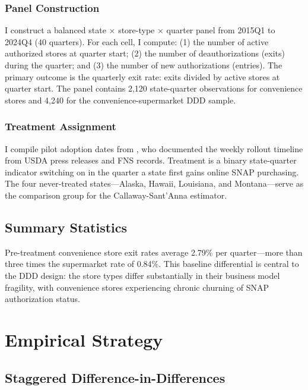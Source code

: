 \documentclass[12pt]{article}
\begin{document}
\subsubsection*{Panel Construction} I construct a balanced state $\times$ store-type $\times$ quarter panel from 2015Q1 to 2024Q4 (40 quarters). For each cell, I compute: (1) the number of active authorized stores at quarter start; (2) the number of deauthorizations (exits) during the quarter; and (3) the number of new authorizations (entries). The primary outcome is the quarterly exit rate: exits divided by active stores at quarter start. The panel contains 2,120 state-quarter observations for convenience stores and 4,240 for the convenience-supermarket DDD sample.

\subsubsection*{Treatment Assignment} I compile pilot adoption dates from \citet{jones_2024}, who documented the weekly rollout timeline from USDA press releases and FNS records. Treatment is a binary state-quarter indicator switching on in the quarter a state first gains online SNAP purchasing. The four never-treated states---Alaska, Hawaii, Louisiana, and Montana---serve as the comparison group for the Callaway-Sant'Anna estimator.

\subsection{Summary Statistics}

\begin{table}[H]
\centering
\begin{threeparttable}

\end{threeparttable}
\end{table}

Pre-treatment convenience store exit rates average 2.79\% per quarter---more than three times the supermarket rate of 0.84\%. This baseline differential is central to the DDD design: the store types differ substantially in their business model fragility, with convenience stores experiencing chronic churning of SNAP authorization status.


\section{Empirical Strategy}

\subsection{Staggered Difference-in-Differences}
\end{document}
